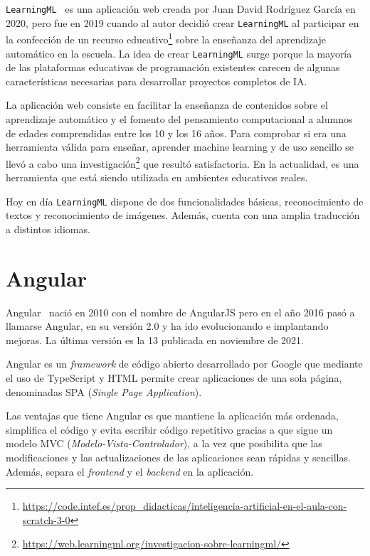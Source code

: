 \documentclass[a4paper, 12pt]{book}
\begin{document}
\texttt{LearningML}~\cite{Pagina_de_LearningML} es una aplicación web creada por Juan David Rodríguez García en 2020, pero fue en 2019 cuando al autor decidió crear \texttt{LearningML} al participar en la confección de un recurso educativo\footnote{\url{https://code.intef.es/prop_didacticas/inteligencia-artificial-en-el-aula-con-scratch-3-0}}  sobre la enseñanza del aprendizaje automático en la escuela. 
La idea de crear \texttt{LearningML} surge porque la mayoría de las plataformas educativas de programación existentes carecen de algunas características necesarias para desarrollar proyectos completos de IA.

La aplicación web consiste en facilitar la enseñanza de contenidos sobre el aprendizaje automático y el fomento del pensamiento computacional a alumnos de edades comprendidas entre los 10 y los 16 años. 
Para comprobar si era una herramienta válida para enseñar, aprender machine learning y de uso sencillo se llevó a cabo una investigación\footnote{\url{https://web.learningml.org/investigacion-sobre-learningml/}} que resultó satisfactoria. 
En la actualidad, es una herramienta que está siendo utilizada en ambientes educativos reales.

Hoy en día \texttt{LearningML} dispone de dos funcionalidades básicas, reconocimiento de textos y reconocimiento de imágenes. 
Además, cuenta con una amplia traducción a distintos idiomas.

\section{Angular} 
\label{sec:Angular}

Angular~\cite{Pagina_de_angular, Curso_de_angular} nació en 2010 con el nombre de AngularJS pero en el año 2016 pasó a llamarse Angular, en su versión 2.0 y ha ido evolucionando e implantando mejoras. 
La última versión es la 13 publicada en noviembre de 2021.

Angular es un \emph{framework} de código abierto desarrollado por Google que mediante el uso de TypeScript y HTML permite crear aplicaciones de una sola página, denominadas SPA (\emph{Single Page Application}).

Las ventajas que tiene Angular es que mantiene la aplicación más ordenada, simplifica el código y evita escribir código repetitivo gracias a que sigue un modelo MVC (\emph{Modelo-Vista-Controlador}), a la vez que posibilita que las modificaciones y las actualizaciones de las aplicaciones sean rápidas y sencillas. 
Además, separa el \emph{frontend} y el \emph{backend} en la aplicación.
\end{document}
